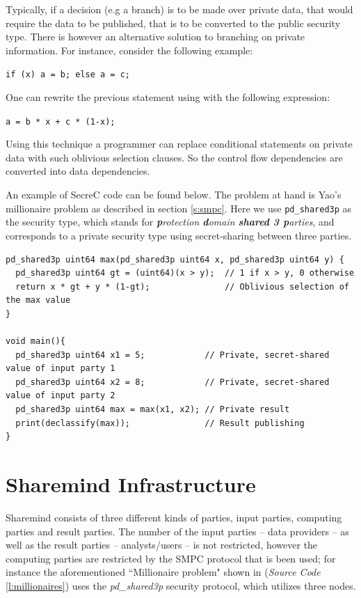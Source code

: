 Typically, if a decision (e.g a branch) is to be made over private data, that would require the data to be published, that is to be converted to the public security type.
There is however an alternative solution to branching on private information.
For instance, consider the following example:

\texttt{if (x) a = b; else a = c; }

One can rewrite the previous statement using with the following expression:

\texttt{a = b * x + c * (1-x); }

Using this technique a programmer can replace conditional statements on private data with such oblivious selection clauses.
So the control flow dependencies are converted into data dependencies.

An example of SecreC code can be found below.
The problem at hand is Yao's millionaire problem \cite{yao1982protocols} as described in section \ref{s:smpc}.
Here we use \texttt{pd\_shared3p} as the security type, which stands for \textit{\textbf{p}rotection \textbf{d}omain \textbf{shared 3 p}arties}, and corresponds to a private security type using secret\hyp sharing between three parties.

{
\begin{verbatim}
pd_shared3p uint64 max(pd_shared3p uint64 x, pd_shared3p uint64 y) {
  pd_shared3p uint64 gt = (uint64)(x > y);  // 1 if x > y, 0 otherwise
  return x * gt + y * (1-gt);               // Oblivious selection of the max value
}

void main(){
  pd_shared3p uint64 x1 = 5;            // Private, secret-shared value of input party 1
  pd_shared3p uint64 x2 = 8;            // Private, secret-shared value of input party 2
  pd_shared3p uint64 max = max(x1, x2); // Private result
  print(declassify(max));               // Result publishing
}
\end{verbatim}
\label{l:millionaires}
}




\section{Sharemind Infrastructure}
Sharemind consists of three different kinds of parties, input parties, computing parties and result parties.
The number of the input parties -- data providers -- as well as the result parties -- analysts/users -- is not restricted, however the computing parties are restricted by the SMPC protocol that is been used; for instance the aforementioned ``Millionaire problem" shown in (\textit{Source Code} \ref{l:millionaires}) uses the \textit{pd\_shared3p} security protocol, which utilizes three nodes.

